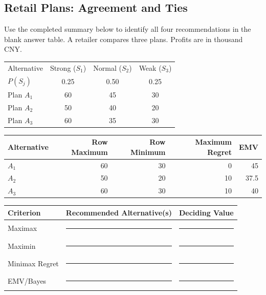 \subsection{Retail Plans: Agreement and Ties}\label{sec:c8-agreement}
Use the completed summary below to identify all four recommendations in the blank answer table.
A retailer compares three plans. Profits are in thousand CNY.
\begin{center}
\begin{tabular}{lccc}\toprule
Alternative & Strong ($S_1$) & Normal ($S_2$) & Weak ($S_3$)\\
$P(S_j)$ & 0.25 & 0.50 & 0.25\\\midrule
Plan $A_1$ & 60 & 45 & 30\\
Plan $A_2$ & 50 & 40 & 20\\
Plan $A_3$ & 60 & 35 & 30\\\bottomrule
\end{tabular}
\end{center}
\begin{center}
\begin{tabular}{lrrrr}\toprule
Alternative & Row Maximum & Row Minimum & Maximum Regret & EMV\\\midrule
$A_1$ & 60 & 30 & 0 & 45\\
$A_2$ & 50 & 20 & 10 & 37.5\\
$A_3$ & 60 & 30 & 10 & 40\\\bottomrule
\end{tabular}
\end{center}
\begin{center}
\begin{tabular}{lll}\toprule
Criterion & Recommended Alternative(s) & Deciding Value\\\midrule
Maximax & \rule{3cm}{0.4pt} & \rule{2cm}{0.4pt}\\
Maximin & \rule{3cm}{0.4pt} & \rule{2cm}{0.4pt}\\
Minimax Regret & \rule{3cm}{0.4pt} & \rule{2cm}{0.4pt}\\
EMV/Bayes & \rule{3cm}{0.4pt} & \rule{2cm}{0.4pt}\\\bottomrule
\end{tabular}
\end{center}


